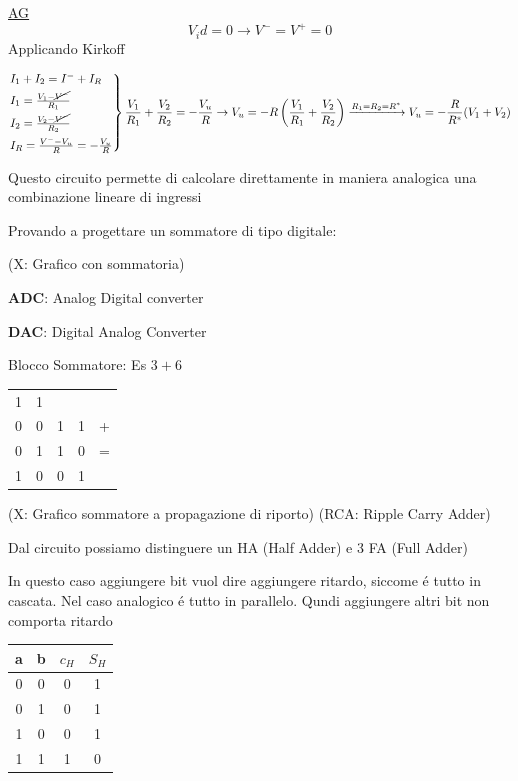 \documentclass{article}
\begin{document}
\underline{AG}
\[ V_id = 0 \rightarrow V^- = V^+ = 0\]
Applicando Kirkoff

\[ \begin{rcases}
        I_1 + I_2 = I^- + I_R\\
        I_1 = \frac{V_1 - \cancel{V^-}}{R_1} \\
        I_2 = \frac{V_2 - \cancel{V^-}}{R_2} \\
        I_R = \frac{V^- - V_u}{R} = -\frac{V_u}{R}\\
    \end{rcases}
    \frac{V_1}{R_1} + \frac{V_2}{R_2} = -\frac{V_u}{R} \rightarrow V_u = -R\left( \frac{V_1}{R_1} + \frac{V_2}{R_2}\right)  \xrightarrow{R_1 = R_2 = R^*} V_u = -\frac{R}{R^*}(V_1 + V_2)
\]

Questo circuito permette di calcolare direttamente in maniera analogica una combinazione lineare di ingressi

Provando a progettare un sommatore di tipo digitale:

(X: Grafico con sommatoria)

\textbf{ADC}: Analog Digital converter

\textbf{DAC}: Digital Analog Converter

Blocco Sommatore: Es $3+6$

\begin{tabular}{c c c c c}
    1 & 1 & \\
    0 & 0 & 1 & 1 & + \\
    0 & 1 & 1 & 0 & = \\
    \hline
    1 & 0 & 0 & 1
\end{tabular}

(X: Grafico sommatore a propagazione di riporto)
(RCA: Ripple Carry Adder)

Dal circuito possiamo distinguere un HA (Half Adder) e 3 FA (Full Adder)

In questo caso aggiungere bit vuol dire aggiungere ritardo, siccome \'e tutto in cascata. Nel caso analogico \'e tutto in parallelo. Qundi aggiungere altri bit non comporta ritardo

\begin{tabular}{c c|c c}
    a & b & $c_H$ & $S_H$\\
    \hline
    0 & 0 & 0 & 1 \\
    0 & 1 & 0 & 1 \\
    1 & 0 & 0 & 1 \\
    1 & 1 & 1 & 0
\end{tabular}
\end{document}
